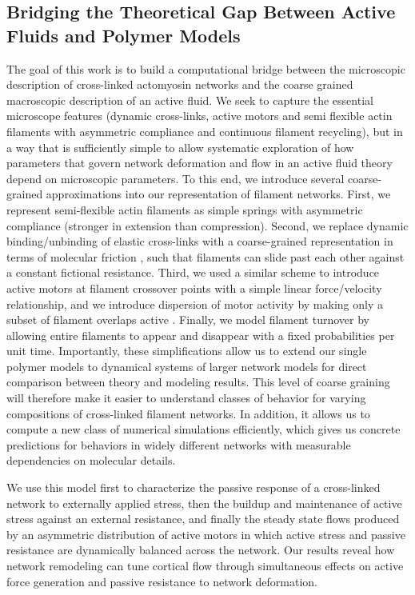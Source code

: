 \subsection{Bridging the Theoretical Gap Between Active Fluids and Polymer Models}  The goal of this work is to build a computational bridge between the microscopic description of cross-linked actomyosin networks and the coarse grained macroscopic description of an active fluid.  We seek to capture the essential microscope features (dynamic cross-links, active motors and semi flexible actin filaments with asymmetric compliance and continuous filament recycling), but in a way that is sufficiently simple to allow systematic exploration of how parameters that govern network deformation and flow in an active fluid theory depend on microscopic parameters. To this end, we introduce several coarse-grained approximations into our representation of filament networks. First, we represent semi-flexible actin filaments as simple springs with asymmetric compliance (stronger in extension than compression). Second, we replace  dynamic binding/unbinding of elastic cross-links with a coarse-grained representation in terms of molecular friction \cite{theo_friction,theo_frictionSam,theo_molefric}, such that filaments can slide past each other against a constant fictional resistance. Third, we used a similar scheme to introduce active motors at filament crossover points with a simple linear force/velocity relationship, and we introduce dispersion of motor activity by making only a subset of filament overlaps active \cite{theo_frictionShila}.  Finally, we model filament turnover by allowing entire filaments to appear and disappear with a fixed probabilities per unit time. Importantly, these simplifications allow us to extend our single polymer models to dynamical systems of larger network models for direct comparison between theory and modeling results. This level of coarse graining will therefore make it easier to understand classes of behavior for varying compositions of cross-linked filament networks. In addition, it allows us to compute a new class of numerical simulations efficiently, which gives us concrete predictions for behaviors in widely different networks with measurable dependencies on molecular details. 

We use this model first to characterize the passive response of a cross-linked network to externally applied stress, then the buildup and maintenance of active stress against an external resistance, and finally the steady state flows produced by an asymmetric distribution of active motors in which active stress and passive resistance are dynamically balanced across the network.  Our results reveal how network remodeling can tune cortical flow through simultaneous effects on active force generation and passive resistance to network deformation. 

